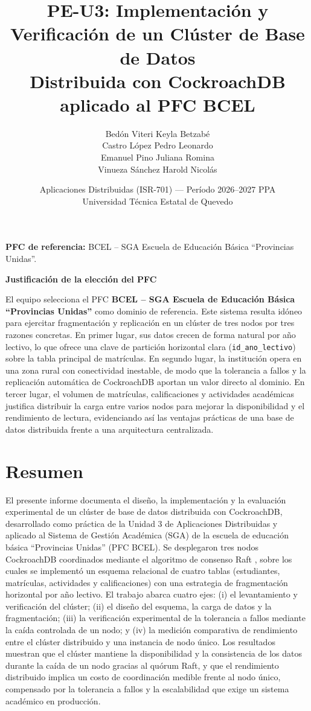 \documentclass[10pt,a4paper]{article}
\title{\textbf{PE-U3: Implementación y Verificación de un Clúster de Base de Datos\\
Distribuida con CockroachDB aplicado al PFC BCEL}}
\author{
Bedón Viteri Keyla Betzabé \\
Castro López Pedro Leonardo \\
Emanuel Pino Juliana Romina \\
Vinueza Sánchez Harold Nicolás
}
\date{Aplicaciones Distribuidas (ISR-701) --- Período 2026--2027 PPA \\ Universidad Técnica Estatal de Quevedo}
\begin{document}
\maketitle

\noindent\textbf{PFC de referencia:} BCEL -- SGA Escuela de Educación Básica ``Provincias Unidas''.



\bigskip
\noindent\textbf{Justificación de la elección del PFC}

El equipo selecciona el PFC \textbf{BCEL -- SGA Escuela de Educación Básica
``Provincias Unidas''} como dominio de referencia. Este sistema resulta idóneo para
ejercitar fragmentación y replicación en un clúster de tres nodos por tres razones
concretas. En primer lugar, sus datos crecen de forma natural por año lectivo, lo que
ofrece una clave de partición horizontal clara (\texttt{id\_ano\_lectivo}) sobre la
tabla principal de matrículas. En segundo lugar, la institución opera en una zona
rural con conectividad inestable, de modo que la tolerancia a fallos y la replicación
automática de CockroachDB aportan un valor directo al dominio. En tercer lugar, el
volumen de matrículas, calificaciones y actividades académicas justifica distribuir
la carga entre varios nodos para mejorar la disponibilidad y el rendimiento de
lectura, evidenciando así las ventajas prácticas de una base de datos distribuida
frente a una arquitectura centralizada.

\tableofcontents
\newpage

\section{Resumen}
 
El presente informe documenta el diseño, la implementación y la evaluación
experimental de un clúster de base de datos distribuida con CockroachDB,
desarrollado como práctica de la Unidad 3 de Aplicaciones Distribuidas y
aplicado al Sistema de Gestión Académica (SGA) de la escuela de educación
básica ``Provincias Unidas'' (PFC BCEL). Se desplegaron tres nodos
CockroachDB coordinados mediante el algoritmo de consenso Raft
\cite{ongaro2014,taft2020}, sobre los cuales se implementó un esquema
relacional de cuatro tablas (estudiantes, matrículas, actividades y
calificaciones) con una estrategia de fragmentación horizontal por año
lectivo. El trabajo abarca cuatro ejes: (i) el levantamiento y
verificación del clúster; (ii) el diseño del esquema, la carga de datos y
la fragmentación; (iii) la verificación experimental de la tolerancia a
fallos mediante la caída controlada de un nodo; y (iv) la medición
comparativa de rendimiento entre el clúster distribuido y una instancia de
nodo único. Los resultados muestran que el clúster mantiene la
disponibilidad y la consistencia de los datos durante la caída de un nodo
gracias al quórum Raft, y que el rendimiento distribuido implica un costo
de coordinación medible frente al nodo único, compensado por la tolerancia
a fallos y la escalabilidad que exige un sistema académico en producción.
 
\end{document}
